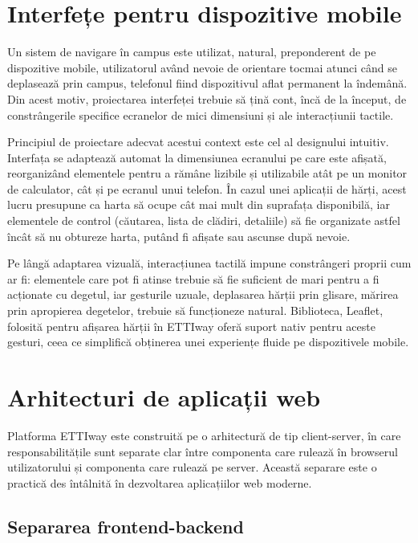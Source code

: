 \section{Interfețe pentru dispozitive mobile}
\label{sec:mobil}

Un sistem de navigare în campus este utilizat, natural, preponderent de pe
dispozitive mobile, utilizatorul având nevoie de orientare tocmai atunci când se
deplasează prin campus, telefonul fiind dispozitivul aflat permanent la îndemână.
Din acest motiv, proiectarea interfeței trebuie să țină cont, încă de la început,
de constrângerile specifice ecranelor de mici dimensiuni și ale interacțiunii
tactile.

Principiul de proiectare adecvat acestui context este cel al designului intuitiv.
Interfața se adaptează automat la dimensiunea ecranului pe care este
afișată, reorganizând elementele pentru a rămâne lizibile și utilizabile atât pe
un monitor de calculator, cât și pe ecranul unui telefon. În cazul unei aplicații
de hărți, acest lucru presupune ca harta să ocupe cât mai mult din suprafața
disponibilă, iar elementele de control (căutarea, lista de clădiri, detaliile)
să fie organizate astfel încât să nu obtureze harta, putând fi afișate sau
ascunse după nevoie.

Pe lângă adaptarea vizuală, interacțiunea tactilă impune constrângeri proprii cum ar fi:
elementele care pot fi atinse trebuie să fie suficient de mari pentru a fi
acționate cu degetul, iar gesturile uzuale, deplasarea hărții prin glisare,
mărirea prin apropierea degetelor, trebuie să funcționeze natural. Biblioteca, Leaflet,
folosită pentru afișarea hărții în ETTIway oferă suport nativ pentru aceste
gesturi, ceea ce simplifică obținerea unei experiențe fluide pe dispozitivele
mobile\cite{Leaflet}.


\section{Arhitecturi de aplicații web}
\label{sec:arhitecturi-web}

Platforma ETTIway este construită pe o arhitectură de tip client-server, în care
responsabilitățile sunt separate clar între componenta care rulează în browserul
utilizatorului și componenta care rulează pe server. Această separare este o
practică des întâlnită în dezvoltarea aplicațiilor web moderne.

\subsection{Separarea frontend-backend}
\label{subsec:frontend-backend}

